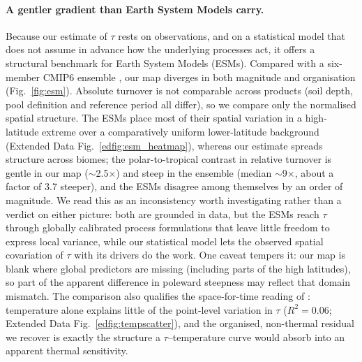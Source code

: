 \documentclass[12pt, a4paper]{article}
\begin{document}
\paragraph{A gentler gradient than Earth System Models carry.}
Because our estimate of $\tau$ rests on observations, and on a statistical model
that does not assume in advance how the underlying processes act, it offers a
structural benchmark for Earth System Models (ESMs). Compared with a six-member
CMIP6 ensemble \citep{Varney2022}, our map diverges in both magnitude and
organisation (Fig.~\ref{fig:esm}). Absolute turnover is not comparable across
products (soil depth, pool definition and reference period all differ), so we
compare only the normalised spatial structure. The ESMs place most of their spatial
variation in a high-latitude extreme over a comparatively uniform lower-latitude
background (Extended Data Fig.~\ref{edfig:esm_heatmap}),
whereas our estimate spreads structure across biomes; the polar-to-tropical contrast
in relative turnover is gentle in our map ($\sim$2.5$\times$) and steep in the
ensemble (median $\sim$9$\times$, about a factor of 3.7 steeper), and the ESMs
disagree among themselves by an order of magnitude. We read this as an inconsistency
worth investigating rather than a verdict on either picture: both are grounded in
data, but the ESMs reach $\tau$ through globally calibrated process formulations
that leave little freedom to express local variance, while our statistical model
lets the observed spatial covariation of $\tau$ with its drivers do the work. One
caveat tempers it: our map
is blank where global predictors are missing (including parts of the high
latitudes), so part of the apparent difference in poleward steepness may reflect
that domain mismatch. The comparison also qualifies the space-for-time reading of
\citet{Varney2020}: temperature alone explains little of the point-level variation
in $\tau$ ($R^2=0.06$; Extended Data Fig.~\ref{edfig:tempscatter}), and the
organised, non-thermal residual we recover is
exactly the structure a $\tau$--temperature curve would absorb into an apparent
thermal sensitivity.
\end{document}
